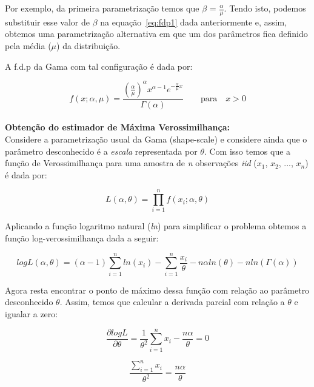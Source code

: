 Por exemplo, da primeira parametrização temos que $\beta$ = $\frac{\alpha}{\mu}$. Tendo isto, podemos substituir esse valor de $\beta$ na equação~\eqref{eq:fdp1} dada anteriormente e, assim, obtemos uma parametrização alternativa em que um dos parâmetros fica definido pela média ($\mu$) da distribuição.

A f.d.p da Gama com tal configuração é dada por:

\begin{equation}
f(x; \alpha, \mu )=\frac{(\frac{\alpha}{\mu})^{\alpha}x^{\alpha-1}e^{-\frac{\alpha}{\mu} x}}{\Gamma(\alpha)} \qquad \text{para} \quad x > 0
\end{equation}\\

\textbf{Obtenção do estimador de Máxima Verossimilhança:}\\

Considere a parametrização usual da Gama (shape-scale) e considere ainda que o parâmetro desconhecido é a \textit{escala} representada por $\theta$. Com isso temos que a função de Verossimilhança para uma amostra de \emph{n} observações \emph{iid} ($x_1$, $x_2$, ..., $x_n$) é dada por:

\begin{equation}
L(\alpha, \theta) = \prod_{i=1}^{n} f(x_i; \alpha, \theta)
\end{equation}

Aplicando a função logaritmo natural (\textit{ln}) para simplificar o problema obtemos  a função log-verossimilhança dada a seguir:

\begin{equation}
logL(\alpha, \theta) = (\alpha-1) \sum_{i=1}^{n} ln(x_i) - \sum_{i=1}^{n} \frac{x_i}{\theta} - n \alpha ln(\theta) - n ln(\Gamma(\alpha))
\end{equation}

Agora resta encontrar o ponto de máximo dessa função com relação ao parâmetro desconhecido $\theta$. Assim, temos que calcular a derivada parcial com relação a $\theta$ e igualar a zero:

\begin{equation}
\frac{\partial logL}{\partial \theta} = \frac{1}{\theta^2}\sum_{i=1}^{n}x_i - \frac{n\alpha}{\theta} = 0
\end{equation}

\begin{equation}
\frac{\sum_{i=1}^{n}x_i}{\theta^2} = \frac{n\alpha}{\theta} 
\end{equation}\\

